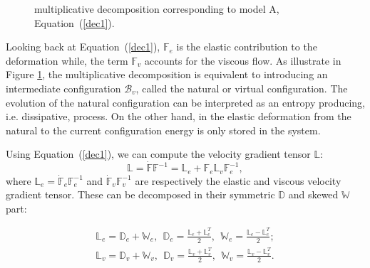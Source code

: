 \documentclass[runningheads]{llncs}
\newcommand{\F}{\ensuremath{\mathbb{F}}}
\newcommand{\LL}{\ensuremath{\mathbb{L}}}
\begin{document}
%	
%	

\begin{figure}[h!]
	\centering
	\hspace{20mm}
	\Large
	\def\svgwidth{0.6\linewidth}
	\caption{multiplicative decomposition corresponding to model A, Equation~(\ref{dec1}).}
\label{Model2}
\end{figure}

Looking back at Equation~(\ref{dec1}), $\F_e$ is the elastic contribution to the deformation while, the term $\F_v$ accounts for the viscous flow. As illustrate in Figure \ref{Model2}, the multiplicative decomposition is equivalent to introducing an intermediate configuration $\mathcal{B}_v$, called the natural or virtual configuration. The evolution of the natural configuration can be interpreted as an entropy producing, i.e. dissipative, process. On the other hand, in the elastic deformation from the natural to the current configuration energy is only stored in the system. 

Using Equation~(\ref{dec1}), we can compute the velocity gradient tensor $\LL$:
\begin{equation}
\LL = \dot{\F}\F^{-1} = \LL_e + \F_e \LL_v \F_e^{-1},
\end{equation}
where $\LL_e=\dot{\F}_e\F_e^{-1}$ and $\dot{\F}_v\F_v^{-1}$ are respectively the elastic and viscous velocity gradient tensor. These can be decomposed in their symmetric $\mathbb{D}$ and skewed $\mathbb{W}$ part:

\begin{equation}
\begin{aligned}
\LL_e = \mathbb{D}_e + \mathbb{W}_e, \ \ \mathbb{D}_e = \frac{\LL_e+\LL^T_e}{2}, \ \ \mathbb{W}_e = \frac{\LL_e-\LL^T_e}{2};\\
\LL_v = \mathbb{D}_v + \mathbb{W}_v,  \ \ \mathbb{D}_v = \frac{\LL_v+\LL^T_v}{2}, \ \ \mathbb{W}_v = \frac{\LL_v-\LL^T_v}{2}.
\end{aligned}
\end{equation}
\end{document}
